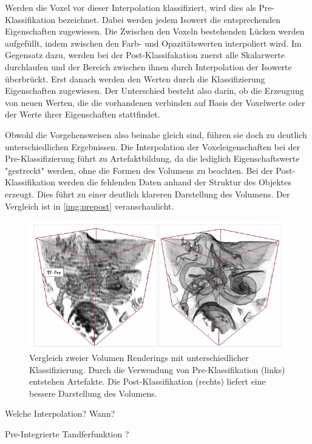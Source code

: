 Werden die Voxel vor dieser Interpolation klassifiziert, wird dies als Pre-Klassifikation bezeichnet. Dabei werden jedem Isowert die entsprechenden Eigenschaften zugewiesen. Die Zwischen den Voxeln bestehenden Lücken werden aufgefüllt, indem zwischen den Farb- und Opazitätswerten interpoliert wird. 
Im Gegensatz dazu, werden bei der Post-Klassifakation zuerst alle Skalarwerte durchlaufen und der Bereich zwischen ihnen durch Interpolation der Isowerte überbrückt. Erst danach werden den Werten durch die Klassifizierung Eigenschaften zugewiesen. Der Unterschied besteht also darin, ob die Erzeugung von neuen Werten, die die vorhandenen verbinden auf Basis der Voxelwerte oder der Werte ihrer Eigenschaften stattfindet. \cite{Hadwiger06}



Obwohl die Vorgehensweisen also beinahe gleich sind, führen sie doch zu deutlich unterschiedlichen Ergebnissen. Die Interpolation der Voxeleigenschaften bei der Pre-Klassifizierung führt zu Artefaktbildung, da die lediglich Eigenschaftswerte "gestreckt" werden, ohne die Formen des Volumens zu beachten. Bei der Post-Klassifikation werden die fehlenden Daten anhand der Struktur des Objektes erzeugt. Dies führt zu einer deutlich klareren Darstellung des Volumens. Der Vergleich ist in \ref{img:prepost} veranschaulicht.

\begin{figure}
	\centering
	\includegraphics[width=0.7\linewidth]{images/prepostclassification.png}
	\caption{Vergleich zweier Volumen Renderings mit unterschiedlicher Klassifizierung. Durch die Verwendung von Pre-Klassifikation (links) entstehen Artefakte. Die Post-Klassifikation (rechts) liefert eine bessere Darstellung des Volumens.}
	\label{img:repost}
\end{figure}

Welche Interpolation? Wann?

Pre-Integrierte Tandferfunktion ? 

